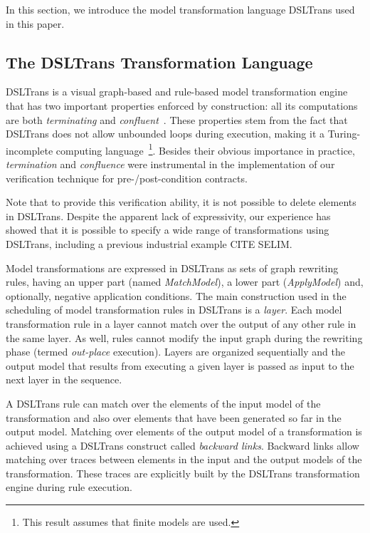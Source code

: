 In this section, we introduce the model transformation language DSLTrans used in this paper.

\subsection{The DSLTrans Transformation Language}


DSLTrans is a visual graph-based and rule-based model
transformation engine that has two important properties enforced by construction: all its computations
are both \emph{terminating} and \emph{confluent}~\cite{Barroca2011}.
These properties stem from the fact that DSLTrans does not allow
unbounded loops during execution, making it a Turing-incomplete
computing language~\cite{Barroca2011}\footnote{This result assumes that finite models are
used.}. Besides their obvious importance in
practice, \emph{termination} and \emph{confluence} were instrumental in the
implementation of our verification technique for pre-/post-condition contracts.

Note that to provide this verification ability, it is not possible to delete elements in DSLTrans.
Despite the apparent lack of expressivity, our experience has showed that it is
possible to specify a wide range of transformations using DSLTrans, including a previous industrial example CITE SELIM.

Model transformations are expressed in DSLTrans as sets of graph rewriting
rules, having an upper part (named \emph{MatchModel}), a lower part (\emph{ApplyModel}) and,
optionally, negative application conditions. The main construction
used in the scheduling of model transformation rules in DSLTrans is a
\emph{layer}. Each model transformation rule in a layer cannot match over the output of any other rule in the same layer. As well, rules cannot modify the input graph during the rewriting phase (termed \emph{out-place} execution). Layers are organized sequentially and
the output model that results from executing a given layer is passed as input to
the next layer in the sequence.


A DSLTrans rule can match over the elements of the input model of the
transformation and also over elements that have been generated so far in the
output model. Matching over elements of the output model of a
transformation is achieved using a DSLTrans construct called \emph{backward
links}. Backward links allow matching over traces between elements in the input and
the output models of the transformation. These traces are explicitly built by
the DSLTrans transformation engine during rule execution.

